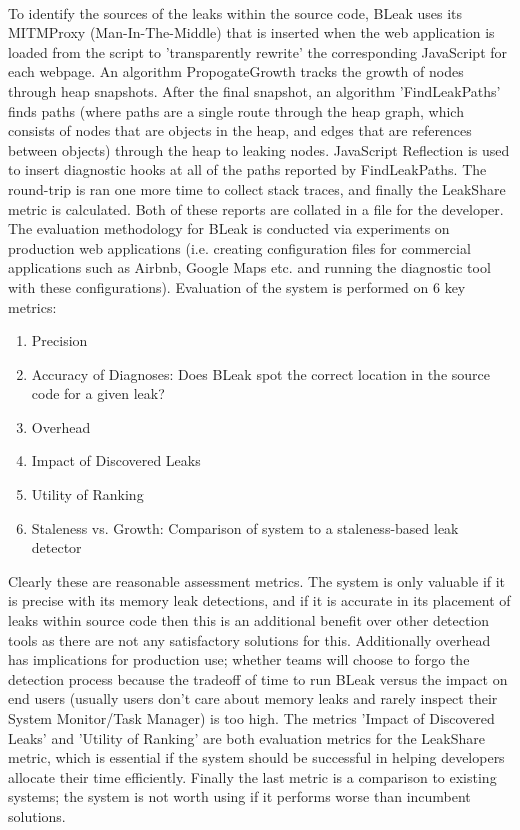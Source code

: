 \documentclass[12pt]{article}
\begin{document}
\begin{enumerate}[(a)]
    \\\newline To identify the sources of the leaks within the source code, BLeak uses its MITMProxy (Man-In-The-Middle) that is inserted when the web application is loaded from the script to 'transparently rewrite' the corresponding JavaScript for each webpage. An algorithm PropogateGrowth tracks the growth of nodes through heap snapshots. After the final snapshot, an algorithm 'FindLeakPaths' finds paths (where paths are a single route through the heap graph, which consists of nodes that are objects in the heap, and edges that are references between objects) through the heap to leaking nodes. JavaScript Reflection is used to insert diagnostic hooks at all of the paths reported by FindLeakPaths. The round-trip is ran one more time to collect stack traces, and finally the LeakShare metric is calculated. Both of these reports are collated in a file for the developer.\\\newline
    The evaluation methodology for BLeak is conducted via experiments on production web applications (i.e. creating configuration files for commercial applications such as Airbnb, Google Maps etc. and running the diagnostic tool with these configurations). Evaluation of the system is performed on 6 key metrics: 
    \begin{enumerate}[(1)]
        \item Precision
        \item Accuracy of Diagnoses: Does BLeak spot the correct location in the source code for a given leak?
        \item Overhead
        \item Impact of Discovered Leaks
        \item Utility of Ranking
        \item Staleness vs. Growth: Comparison of system to a staleness-based leak detector
    \end{enumerate}
    Clearly these are reasonable assessment metrics. The system is only valuable if it is precise with its memory leak detections, and if it is accurate in its placement of leaks within source code then this is an additional benefit over other detection tools as there are not any satisfactory solutions for this. Additionally overhead has implications for production use; whether teams will choose to forgo the detection process because the tradeoff of time to run BLeak versus the impact on end users (usually users don't care about memory leaks and rarely inspect their System Monitor/Task Manager) is too high. The metrics 'Impact of Discovered Leaks' and 'Utility of Ranking' are both evaluation metrics for the LeakShare metric, which is essential if the system should be successful in helping developers allocate their time efficiently. Finally the last metric is a comparison to existing systems; the system is not worth using if it performs worse than incumbent solutions. \\\newline

\end{enumerate}
\end{document}
